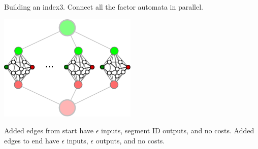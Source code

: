 \begin{frame}{Building an index}{3. Connect all the factor automata in parallel.}
  \begin{center}
    \includegraphics[width=66mm]{figures/index}
    \end{center}
  \vfill
  Added edges from start have $\epsilon$ inputs, segment ID outputs, and no costs.
  Added edges to end have $\epsilon$ inputs, $\epsilon$ outputs, and no costs.
\end{frame}





